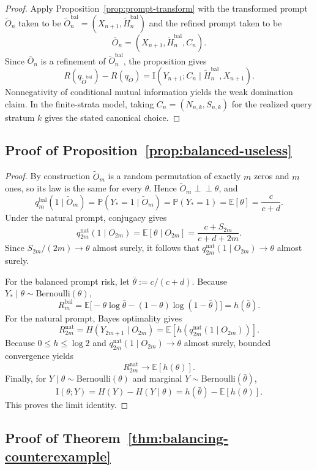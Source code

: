\documentclass{article}
\theoremstyle{definition}
\theoremstyle{remark}
\newcommand{\E}{\mathbb{E}}
\newcommand{\Pbb}{\mathbb{P}}
\newcommand{\I}{\mathrm{I}}
\newcommand{\Ber}{\mathrm{Bernoulli}}
\begin{document}
\begin{proof}
Apply Proposition~\ref{prop:prompt-transform} with the transformed prompt $\widetilde O_n$ taken to be $\widetilde O_n^{\mathrm{bal}}=(X_{n+1},\widetilde H_n^{\mathrm{bal}})$ and the refined prompt taken to be
\[
\bar O_n=(X_{n+1},\widetilde H_n^{\mathrm{bal}},C_n).
\]
Since $\bar O_n$ is a refinement of $\widetilde O_n^{\mathrm{bal}}$, the proposition gives
\[
R(q_{\widetilde O^{\mathrm{bal}}})-R(q_{\bar O})
=
\I(Y_{n+1};C_n\mid \widetilde H_n^{\mathrm{bal}},X_{n+1}).
\]
Nonnegativity of conditional mutual information yields the weak domination claim. In the finite-strata model, taking $C_n=(N_{n,k},S_{n,k})$ for the realized query stratum $k$ gives the stated canonical choice.
\end{proof}

\subsection{Proof of Proposition~\ref{prop:balanced-useless}}

\begin{proof}
By construction $\widetilde O_m$ is a random permutation of exactly $m$ zeros and $m$ ones, so its law is the same for every $\theta$. Hence $\widetilde O_m \perp\!\!\!\perp \theta$, and
\[
q_m^{\mathrm{bal}}(1\mid \widetilde O_m)
=
\Pbb(Y_*=1\mid \widetilde O_m)
=
\Pbb(Y_*=1)
=
\E[\theta]
=
\frac{c}{c+d}.
\]
Under the natural prompt, conjugacy gives
\[
q_{2m}^{\mathrm{nat}}(1\mid O_{2m})
=
\E[\theta\mid O_{2m}]
=
\frac{c+S_{2m}}{c+d+2m}.
\]
Since $S_{2m}/(2m)\to \theta$ almost surely, it follows that $q_{2m}^{\mathrm{nat}}(1\mid O_{2m})\to \theta$ almost surely.

For the balanced prompt risk, let $\bar \theta:=c/(c+d)$. Because $Y_*\mid \theta \sim \Ber(\theta)$,
\[
R_m^{\mathrm{bal}}
=
\E\bigl[-\theta\log \bar\theta -(1-\theta)\log(1-\bar\theta)\bigr]
=
h(\bar\theta).
\]
For the natural prompt, Bayes optimality gives
\[
R_{2m}^{\mathrm{nat}}
=
H(Y_{2m+1}\mid O_{2m})
=
\E\!\left[h\!\left(q_{2m}^{\mathrm{nat}}(1\mid O_{2m})\right)\right].
\]
Because $0\le h\le \log 2$ and $q_{2m}^{\mathrm{nat}}(1\mid O_{2m})\to \theta$ almost surely, bounded convergence yields
\[
R_{2m}^{\mathrm{nat}}\to \E[h(\theta)].
\]
Finally, for $Y\mid \theta\sim \Ber(\theta)$ and marginal $Y\sim \Ber(\bar \theta)$,
\[
\I(\theta;Y)
=
H(Y)-H(Y\mid \theta)
=
h(\bar\theta)-\E[h(\theta)].
\]
This proves the limit identity.
\end{proof}

\subsection{Proof of Theorem~\ref{thm:balancing-counterexample}}
\end{document}

